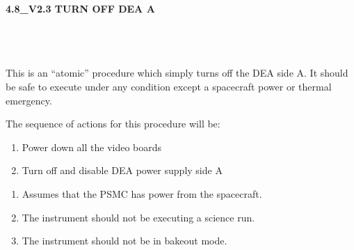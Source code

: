 \documentclass[11pt]{article}
\begin{document}
%
%
%
\newcommand{\be}{\begin{enumerate}}
\newcommand{\ee}{\end{enumerate}}
\newcommand{\bc}{\begin{center}}
\newcommand{\ec}{\end{center}}
\newcommand{\bi}{\begin{itemize}}
\newcommand{\ei}{\end{itemize}}
\newcommand{\bd}{\begin{description}}
\newcommand{\ed}{\end{description}}
\newcommand{\bt}{\begin{tabbing}}
\newcommand{\et}{\end{tabbing}}
\newcommand{\eg}{{\it e.g.~}}
\newcommand{\ie}{{\it i.e.~}}
\newcommand{\ul}{\underline}
\newcommand{\axaf}{{\em AXAF}}
\def\la{\hbox{\rlap{$<$}\lower0.5ex\hbox{$\sim$}\ }}


\large
\centerline {\bf 4.8\_V2.3 TURN OFF DEA A}
\vspace{0.25in}

\normalsize
{}\\
 \\

 \\
\normalsize
This is an ``atomic'' procedure which simply turns off the DEA side A.
It should be safe to execute under any condition except a spacecraft 
power or thermal emergency.

\vspace{0.25in}
\noindent The sequence of actions for this procedure will be:
\be
\item Power down all the video boards
\vspace{-0.10in}
\item Turn off and disable DEA power supply side A
\ee

\vspace{0.15in}
\normalsize
{}
\normalsize
\be
\item Assumes that the PSMC has power from the spacecraft.
\vspace{-0.10in}
\item The instrument should not be executing a science run.
\vspace{-0.10in}
\item The instrument should not be in bakeout mode.
\ee
\vspace{0.1in}
\normalsize
{} \\
\normalsize
\end{document}
